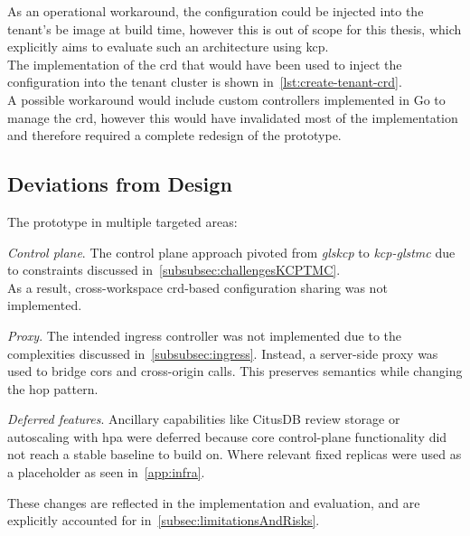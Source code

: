 \documentclass[11pt, a4paper, oneside, listof=totoc]{scrartcl}
\begin{document}
                As an operational workaround, the configuration could be injected into the tenant's
                \gls{be} image at build time, however this is out of scope for this thesis, which
                explicitly aims to evaluate such an architecture using \gls{kcp}.\\
                The implementation of the \gls{crd} that would have been used to inject the
                configuration into the tenant cluster is shown in~\autoref{lst:create-tenant-crd}.\\
                A possible workaround would include custom controllers implemented in Go to manage
                the \gls{crd}, however this would have invalidated most of the implementation and
                therefore required a complete redesign of the prototype.

        \subsection{Deviations from Design}\label{subsec:deviationsFromDesign}
            The prototype in multiple targeted areas:
            \begin{enumerate}[label={[\arabic*]:},
                    ref=Challenge~\arabic*,
                    leftmargin=*,
                    itemsep=0.6\baselineskip]

                    \item\label{chal:controlPlane}
                        \textit{Control plane}.
                        The control plane approach pivoted from \emph{gls{kcp}} to
                        \emph{\gls{kcp}-gls{tmc}} due to constraints discussed
                        in~\autoref{subsubsec:challengesKCPTMC}.\\
                        As a result, cross-workspace \gls{crd}-based configuration sharing was not
                        implemented.

                    \item\label{chal:proxy}
                        \textit{Proxy}.
                        The intended \gls{ingress} controller was not implemented due to the
                        complexities discussed in~\autoref{subsubsec:ingress}.
                        Instead, a server-side proxy was used to bridge \gls{cors} and
                        cross-origin calls.
                        This preserves semantics while changing the hop pattern.

                    \item\label{chal:deferredFeatures}
                        \textit{Deferred features}.
                        Ancillary capabilities like CitusDB review storage or autoscaling with
                        \gls{hpa} were deferred because core control-plane functionality did not
                        reach a stable baseline to build on.
                        Where relevant fixed replicas were used as a placeholder as seen
                        in~\autoref{app:infra}.

            \end{enumerate}
            These changes are reflected in the implementation and evaluation, and are explicitly
            accounted for in~\autoref{subsec:limitationsAndRisks}.
\end{document}
